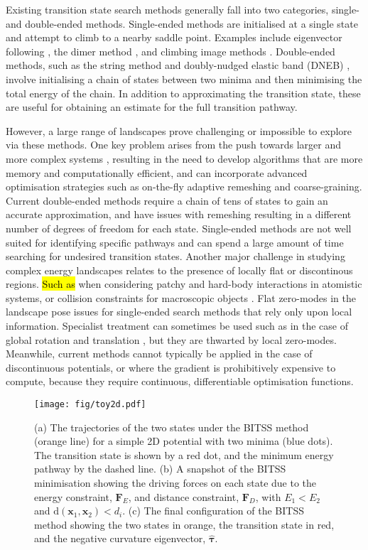 \documentclass[aps,prl,twocolumn,10pt,groupedaddress]{revtex4-2}
\begin{document}
Existing transition state search methods generally fall into two categories, single- and double-ended methods.
Single-ended methods are initialised at a single state and attempt to climb to a nearby saddle point.
Examples include eigenvector following \cite{Cerjan1981}, the dimer method \cite{Heyden2005,Kastner2008}, and climbing image methods \cite{E2007,Ren2013}.
Double-ended methods, such as the string method \cite{E2002,E2007} and doubly-nudged elastic band (DNEB) \cite{Trygubenko2004}, involve initialising a chain of states between two minima and then minimising the total energy of the chain.
In addition to approximating the transition state, these are useful for obtaining an estimate for the full transition pathway.

However, a large range of landscapes prove challenging or impossible to explore via these methods.
One key problem arises from the push towards larger and more complex systems \cite{Trefethen2013,Shalf2020,Alexander2020}, resulting in the need to develop algorithms that are more memory and computationally efficient, and can incorporate advanced optimisation strategies such as on-the-fly adaptive remeshing and coarse-graining.
Current double-ended methods require a chain of tens of states to gain an accurate approximation, and have issues with remeshing resulting in a different number of degrees of freedom for each state.
Single-ended methods are not well suited for identifying specific pathways and can spend a large amount of time searching for undesired transition states.
Another major challenge in studying complex energy landscapes relates to the presence of locally flat or discontinous regions.
\hl{Such as} when considering patchy \cite{McMullen2018,Nguemaha2018,Chen2018b} and hard-body \cite{Richard2018,Santra2018} interactions in atomistic systems, or collision constraints for macroscopic objects \cite{Wriggers2006}.
Flat zero-modes in the landscape pose issues for single-ended search methods that rely only upon local information.
Specialist treatment can sometimes be used such as in the case of global rotation and translation \cite{Page1988}, but they are thwarted by local zero-modes.
Meanwhile, current methods cannot typically be applied in the case of discontinuous potentials, or where the gradient is prohibitively expensive to compute, because they require continuous, differentiable optimisation functions.

\begin{figure}[htb]
  \texttt{[image: fig/toy2d.pdf]}
  \caption{\label{fig:toy2d}
    (a) The trajectories of the two states under the BITSS method (orange line) for a simple 2D potential with two minima (blue dots).
        The transition state is shown by a red dot, and the minimum energy pathway by the dashed line.
    (b) A snapshot of the BITSS minimisation showing the driving forces on each state due to the energy constraint, $\bm{F}_E$, and distance constraint, $\bm{F}_D$, with $E_1 < E_2$ and $\mathrm{d}(\bm{x}_1,\bm{x}_2) < d_i$.
    (c) The final configuration of the BITSS method showing the two states in orange, the transition state in red, and the negative curvature eigenvector, $\bm{\hat{\tau}}$.
  }
\end{figure}
\end{document}
